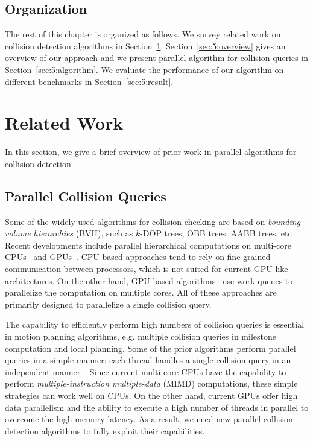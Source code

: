 \subsection{Organization}
The rest of this chapter is organized as follows. We survey related work on collision detection
algorithms in Section~\ref{sec:5:related}. Section~\ref{sec:5:overview} gives an overview of our approach and we present parallel algorithm
for collision queries in Section~\ref{sec:5:algorithm}. We evaluate the performance of our algorithm on different benchmarks in Section~\ref{sec:5:result}.

\section{Related Work}
\label{sec:5:related}
In this section, we give a brief overview of prior work in parallel algorithms for collision
detection.

\subsection{Parallel Collision Queries}
Some of the widely-used algorithms for collision checking are based on \emph{bounding volume hierarchies} (BVH),
such as $k$-DOP trees, OBB trees, AABB trees, etc~\cite{LM03}. Recent developments include parallel hierarchical computations on multi-core CPUs~\cite{Kim08,TMT10-GMOD} and GPUs~\cite{Lauterbach10}. CPU-based approaches tend to rely on fine-grained communication
between processors, which is not suited for current GPU-like architectures. On the other hand, GPU-based
algorithms~\cite{Lauterbach10} use work queues
to parallelize the computation on multiple cores. All of these approaches are primarily designed to parallelize a
single collision query.

The capability to efficiently perform high numbers of collision queries is essential in motion planning algorithms, e.g.
multiple collision queries in milestone computation and local planning. Some of the prior algorithms
perform parallel queries in a simple manner: each thread handles a single collision query in an independent
manner~\cite{Amato99,akinc+2003:prt-p}. Since current multi-core CPUs have the capability to perform \emph{multiple-instruction multiple-data} (MIMD) computations, these simple strategies can work well on CPUs.
On the other hand, current GPUs offer high data parallelism and the ability to execute a high number of threads
in parallel to overcome the high memory latency. As a result, we need new parallel collision detection algorithms
to fully exploit their capabilities.

